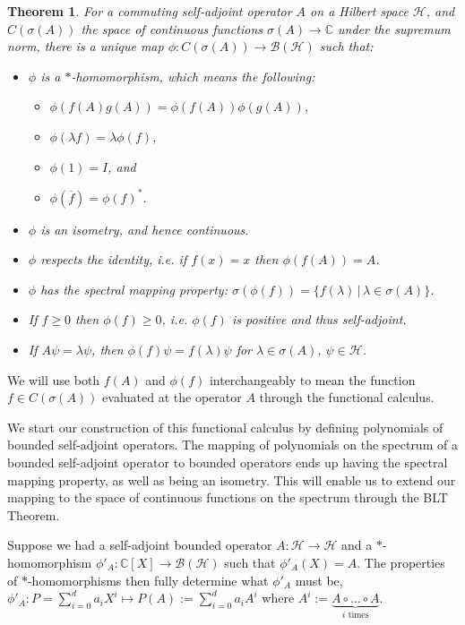 \documentclass[12pt,oneside]{report}
\newtheorem{thm}{Theorem}[chapter]
\begin{document}
\begin{thm}
    For a commuting self-adjoint operator $A$ on a Hilbert space $\mathscr{H}$, and $C(\sigma(A))$ the space of continuous functions $\sigma(A) \to \mathbb{C}$ under the supremum norm, there is a unique map $\phi: C(\sigma(A)) \to \mathscr{B}(\mathscr{H})$ such that:
    \begin{itemize}
        \item $\phi$ is a $*$-homomorphism, which means the following:
        \begin{itemize}
            \item $\phi(f(A)g(A)) = \phi(f(A))\phi(g(A))$,
            \item $\phi(\lambda f) = \lambda \phi(f)$,
            \item $\phi(1) = I$, and
            \item $\phi(\overline{f}) = \phi(f)^{*}$.
        \end{itemize}
        \item $\phi$ is an isometry, and hence continuous.
        \item $\phi$ respects the identity, i.e. if $f(x) = x$ then $\phi(f(A)) = A$.
        \item $\phi$ has the spectral mapping property: $\sigma(\phi(f)) = \{ f(\lambda) \, | \, \lambda \in \sigma(A) \}$.
        \item If $f \geq 0$ then $\phi(f) \geq 0$, i.e. $\phi(f)$ is positive and thus self-adjoint.
        \item If $A\psi = \lambda \psi$, then $\phi(f)\psi = f(\lambda)\psi$ for $\lambda \in \sigma(A)$, $\psi \in \mathscr{H}$.
    \end{itemize}
\end{thm}

We will use both $f(A)$ and $\phi(f)$ interchangeably to mean the function $f \in C(\sigma(A))$ evaluated at the operator $A$ through the functional calculus.

We start our construction of this functional calculus by defining polynomials of bounded self-adjoint operators. The mapping of polynomials on the spectrum of a bounded self-adjoint operator to bounded operators ends up having the spectral mapping property, as well as being an isometry. This will enable us to extend our mapping to the space of continuous functions on the spectrum through the BLT Theorem.

Suppose we had a self-adjoint bounded operator $A: \mathscr{H} \to \mathscr{H}$ and a $*$-homomorphism $\phi'_{A}: \mathbb{C}[X] \to \mathscr{B}(\mathscr{H})$ such that $\phi'_{A}(X) = A$. The properties of $*$-homomorphisms then fully determine what $\phi'_{A}$ must be, $\phi'_{A}: P = \sum_{i=0}^{d} a_{i} X^{i} \mapsto P(A) := \sum_{i=0}^{d} a_{i} A^{i}$ where $A^{i} := \underbrace{ A \circ \dots \circ A }_{ i \text{ times} }$.
\end{document}
